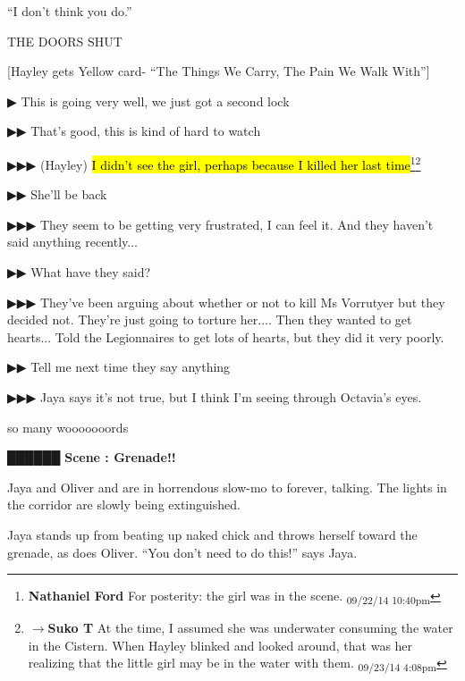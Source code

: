 ``I don't think you do.''

THE DOORS SHUT



{[}Hayley gets Yellow card- ``The Things We Carry, The Pain We Walk With''{]}



 {\color[RGB]{68,68,68}▶}  This is going very well, we just got a second lock

 {\color[RGB]{68,68,68}▶▶}  That's good, this is kind of hard to watch

 {\color[RGB]{68,68,68}▶▶▶ (Hayley) } \hl{I didn't see the girl, perhaps because I killed her last time}\footnote{\textbf{Nathaniel Ford }For posterity: the girl was in the scene. \textsubscript{09/22/14 10:40pm}}\footnote{$\rightarrow$\textbf{Suko T }At the time, I assumed she was underwater consuming the water in the Cistern.  When Hayley blinked and looked around, that was her realizing that the little girl may be in the water with them. \textsubscript{09/23/14 4:08pm}}

 {\color[RGB]{68,68,68}▶▶}  She'll be back

 {\color[RGB]{68,68,68}▶▶▶}  They seem to be getting very frustrated, I can feel it. And they haven't said anything recently...

 {\color[RGB]{68,68,68}▶▶} What have they said?

 {\color[RGB]{68,68,68}▶▶▶} They've been arguing about whether or not to kill Ms Vorrutyer but they decided not. They're just going to torture her.... Then they wanted to get hearts... Told the Legionnaires to get lots of hearts, but they did it very poorly.

 {\color[RGB]{68,68,68}▶▶} Tell me next time they say anything

 {\color[RGB]{68,68,68}▶▶▶} Jaya says it's not true, but I think I'm seeing through Octavia's eyes. 

so many wooooooords





 {\LARGE \textbf{ {\color[RGB]{51,51,51}██████} } }  {\LARGE \textbf{ Scene : Grenade!!} } 

Jaya and Oliver and are in horrendous slow-mo to forever, talking.   The lights in the corridor are slowly being extinguished.



Jaya stands up from beating up naked chick and throws herself toward the grenade, as does Oliver.  ``You don't need to do this!'' says Jaya.

